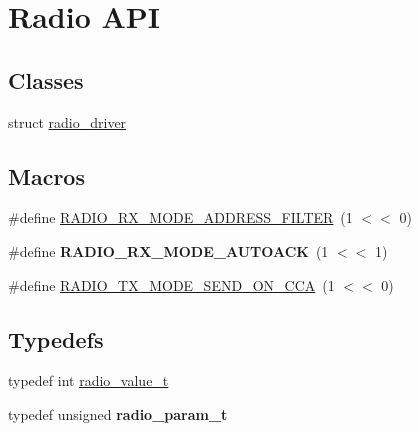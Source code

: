 \hypertarget{group__radio}{}\section{Radio A\+P\+I}
\label{group__radio}
\subsection*{Classes}
\begin{DoxyCompactItemize}
\item 
struct \hyperlink{structradio__driver}{radio\+\_\+driver}
\end{DoxyCompactItemize}
\subsection*{Macros}
\begin{DoxyCompactItemize}
\item 
\#define \hyperlink{group__radio_ga1c0277e7786bb04a0e0cf7cc80ad35a2}{R\+A\+D\+I\+O\+\_\+\+R\+X\+\_\+\+M\+O\+D\+E\+\_\+\+A\+D\+D\+R\+E\+S\+S\+\_\+\+F\+I\+L\+T\+E\+R}~(1 $<$$<$ 0)
\item 
\hypertarget{group__radio_gae0e96ad8f363c7b493d6ac46ca88f2a9}{}\#define {\bfseries R\+A\+D\+I\+O\+\_\+\+R\+X\+\_\+\+M\+O\+D\+E\+\_\+\+A\+U\+T\+O\+A\+C\+K}~(1 $<$$<$ 1)\label{group__radio_gae0e96ad8f363c7b493d6ac46ca88f2a9}

\item 
\#define \hyperlink{group__radio_ga5f5b62a16d559e006cc34139fc59393b}{R\+A\+D\+I\+O\+\_\+\+T\+X\+\_\+\+M\+O\+D\+E\+\_\+\+S\+E\+N\+D\+\_\+\+O\+N\+\_\+\+C\+C\+A}~(1 $<$$<$ 0)
\end{DoxyCompactItemize}
\subsection*{Typedefs}
\begin{DoxyCompactItemize}
\item 
typedef int \hyperlink{group__radio_gad8766f1c2c2c55ac53079fe58750967a}{radio\+\_\+value\+\_\+t}
\item 
\hypertarget{group__radio_ga701dabbed331abea5284556ad604c4dc}{}typedef unsigned {\bfseries radio\+\_\+param\+\_\+t}\label{group__radio_ga701dabbed331abea5284556ad604c4dc}

\end{DoxyCompactItemize}
